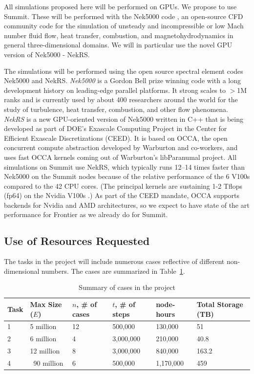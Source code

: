 \documentclass[11pt,letterpaper,english]{article}
\begin{document}
All simulations proposed here will be performed on GPUs. We propose to use
Summit.  These will be performed with the Nek5000 code
\cite{argonne:nekdoc}, an open-source CFD  community code for the simulation of
unsteady and incompressible or low Mach number fluid flow, heat transfer,
combustion, and magnetohydrodynamics in general three-dimensional domains. We
will in particular use the novel GPU version of Nek5000 - NekRS.

The simulations will be performed using the open source spectral element codes
Nek5000 and NekRS.   {\em Nek5000} is a Gordon Bell prize winning code with a
long development history on leading-edge parallel platforms.  It strong scales
to $>$1M ranks \cite{fischer15} and is currently used by about 400 researchers
around the world for the study of turbulence, heat transfer, combustion, and
other flow phenomena.  {\em NekRS} is a new GPU-oriented version of Nek5000
written in C++ that is being developed as part of DOE's Exascale Computing
Project in the Center for Efficient Exascale Discretizations (CEED).  It is
based on OCCA, the open concurrent compute abstraction developed by Warburton
and co-workers, and uses fast OCCA kernels coming out of Warburton's
libParanumal project.  All simulations on Summit use NekRS, which typically
runs 12--14 times faster than Nek5000 on the Summit nodes because of the
relative performance of the 6 V100s compared to the 42 CPU cores.  (The
principal kernels are sustaining 1-2 Tflops (fp64) on the Nvidia V100s
\cite{fischer20a,warburton2019}.) As part of the CEED mandate, OCCA supports
backends for Nvidia and AMD architectures, so we expect to have state of the
art performance for Frontier as we already do for Summit.

\vspace{-.25in}
\subsection{Use of Resources Requested}
\vspace{-.2in}

The tasks in the project will include numerous cases reflective of different
non-dimensional numbers. The cases are summarized in Table~\ref{tab:cases}.

\begin{table}
\centering
\caption{Summary of cases in the project}
\begin{tabular}{llllll}
\hline
\hline
Task & Max Size ($E$) &  $n$, \# of cases  & $t$, \# of steps & node-hours & Total Storage (TB)\\
\hline
\hline
1 & 5 million       & 12   & 500,000   &    130,000 & 51\\
2 & 6 million       & 4    & 3,000,000 &    210,000 & 40.8\\
3 & 12 million      & 8    & 3,000,000 &    840,000 & 163.2\\
4 & ~90 million  & 6    & 500,000   &  1,170,000 & 459\\
\hline
\hline
\end{tabular}
\label{tab:cases}
\end{table}
\end{document}
